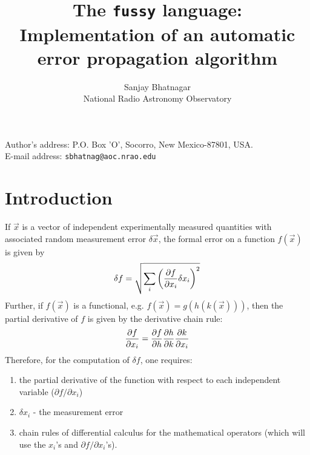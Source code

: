 \documentclass[acmtoms,acmnow]{acmtrans2m}
\title{The {\tt fussy} language: Implementation of an automatic
error propagation algorithm}
\author{Sanjay Bhatnagar\\National Radio Astronomy Observatory}
\begin{document}
\begin{bottomstuff} 
Author's address: P.O. Box 'O', Socorro, New Mexico-87801, USA.\\
E-mail address: {\tt sbhatnag@aoc.nrao.edu}
\end{bottomstuff}
            
\maketitle

\section{Introduction}

If $\vec x$ is a vector of independent experimentally measured
quantities with associated random measurement error $\delta \vec
x$, the formal error on a function $f(\vec x)$ is given by
\begin{equation}
  \delta f = \sqrt{\sum_i {\left( {\partial f \over {\partial x_i}} 
        \delta x_i \right)}^2}
\label{FERR}
\end{equation}
Further, if $f(\vec x)$ is a functional, e.g. $f(\vec x)=g(h(k(\vec
x)))$, then the partial derivative of $f$ is given by the derivative
chain rule:
\begin{equation}
{\partial f \over \partial x_i} = {\partial f \over \partial h} 
{\partial h \over \partial k} {\partial k \over \partial x_i}
\label{DFUNCTIONAL}
\end{equation}
Therefore, for the computation of $\delta f$, one requires:
\begin{enumerate}
\item the partial derivative of the function with respect to each
independent variable ($\partial f / \partial x_i$)
\item $\delta x_i$ - the measurement error
\item chain rules of differential calculus for the
mathematical operators (which will use the $x_i$'s and $\partial f /
\partial x_i$'s).  
\end{enumerate}
\end{document}
